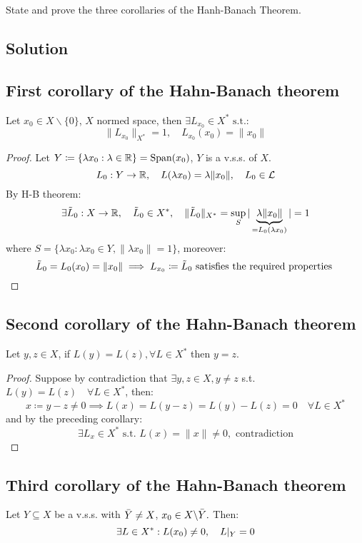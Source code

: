 \sheet


\question
State and prove the three corollaries of the Hanh-Banach Theorem.

\subsection*{Solution}

\subsection{First corollary of the Hahn-Banach theorem}
Let $x_0 \in X \backslash \{0\}$, $X$ normed space, then $\exists L_{x_0} \in X^* \mbox{ s.t.: }$ \[
\|L_{x_0}\|_{X^*} =1,\quad L_{x_0}(x_0) = \|x_0 \|
\]

\begin{proof}
Let $Y\coloneqq \{\lambda x_0 : \lambda \in \mathbb{R}\}=\text{Span}(x_0)$, $Y$ is a v.s.s. of $X$.
\[
L_0:Y\to \mathbb{R} ,\quad L(\lambda x_0) = \lambda \|x_0\|,\quad L_0 \in \mathcal{L}
\]
By H-B theorem: \[
\exists \Tilde{L}_0: X \to \mathbb{R} , \quad \Tilde{L}_0 \in X^*, \quad \|\Tilde{L}_0\|_{X^*}= \sup_S |\underbrace{\lambda \|x_0\|}_{=L_0(\lambda x_0)}| = 1 
\]
where $S = \{\lambda x_0 : \lambda x_0 \in Y , \| \lambda x_0\| = 1\}$, moreover:
\[
\Tilde{L}_0 = L_0(x_0) = \|x_0\| \implies L_{x_0} \coloneqq \Tilde{L}_0 \text{ satisfies the required properties }
\]
\end{proof}

\subsection{Second corollary of the Hahn-Banach theorem}
Let $y,z \in X$, if $L(y)=L(z),\forall L \in X^*$ then $ y=z$.

\begin{proof}
Suppose by contradiction that $\exists y,z \in X, y\neq z$ s.t. $L(y)=L(z)\quad\forall L \in X^*$, then:
\[
x \coloneqq y-z \neq 0 \implies L(x)=L(y-z)=L(y)-L(z)=0\quad\forall L \in X^*
\]
and by the preceding corollary:
\[
\exists L_x \in X^* \mbox{ s.t. } L(x) = \|x\| \neq 0, \mbox{ contradiction}
\]
\end{proof}

\subsection{Third corollary of the Hahn-Banach theorem}
Let $Y \subseteq X$ be a v.s.s. with $\Bar{Y}\neq X$, $x_0 \in X\backslash \Bar{Y}.$ Then:
\[
\exists L \in X^*: L(x_0)\neq 0,\quad L\arrowvert_Y=0
\]

